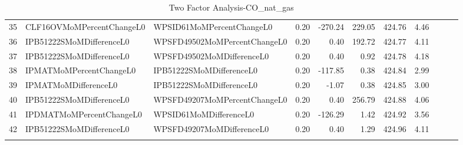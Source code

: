 \begin{longtable}{rllrrrrrlll}
  35 & CLF16OVMoMPercentChangeL0 & WPSID61MoMPercentChangeL0 & 0.20 & -270.24 & 229.05 & 424.76 & 4.46 &  &  &  \\ 
  36 & IPB51222SMoMDifferenceL0 & WPSFD49502MoMPercentChangeL0 & 0.20 & 0.40 & 192.72 & 424.77 & 4.11 &  &  &  \\ 
  37 & IPB51222SMoMDifferenceL0 & WPSFD49502MoMDifferenceL0 & 0.20 & 0.40 & 0.92 & 424.78 & 4.18 &  &  &  \\ 
  38 & IPMATMoMPercentChangeL0 & IPB51222SMoMDifferenceL0 & 0.20 & -117.85 & 0.38 & 424.84 & 2.99 &  &  &  \\ 
  39 & IPMATMoMDifferenceL0 & IPB51222SMoMDifferenceL0 & 0.20 & -1.07 & 0.38 & 424.85 & 3.00 &  &  &  \\ 
  40 & IPB51222SMoMDifferenceL0 & WPSFD49207MoMPercentChangeL0 & 0.20 & 0.40 & 256.79 & 424.88 & 4.06 &  &  &  \\ 
  41 & IPDMATMoMPercentChangeL0 & WPSID61MoMDifferenceL0 & 0.20 & -126.29 & 1.42 & 424.92 & 3.56 &  &  &  \\ 
  42 & IPB51222SMoMDifferenceL0 & WPSFD49207MoMDifferenceL0 & 0.20 & 0.40 & 1.29 & 424.96 & 4.11 &  &  &  \\ 
   \hline
\hline
\caption{Two Factor Analysis-CO_nat_gas} 
\end{longtable}
